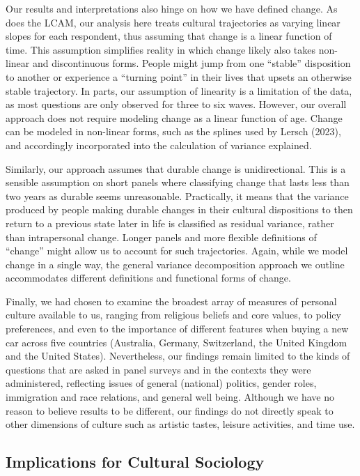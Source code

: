 \documentclass[
  12pt,
]{article}
\begin{document}
Our results and interpretations also hinge on how we have defined
change. As does the LCAM, our analysis here treats cultural trajectories
as varying linear slopes for each respondent, thus assuming that change
is a linear function of time. This assumption simplifies reality in
which change likely also takes non-linear and discontinuous forms.
People might jump from one ``stable'' disposition to another or
experience a ``turning point'' in their lives that upsets an otherwise
stable trajectory. In parts, our assumption of linearity is a limitation
of the data, as most questions are only observed for three to six waves.
However, our overall approach does not require modeling change as a
linear function of age. Change can be modeled in non-linear forms, such
as the splines used by Lersch (2023), and accordingly incorporated into
the calculation of variance explained.

Similarly, our approach assumes that durable change is unidirectional.
This is a sensible assumption on short panels where classifying change
that lasts less than two years as durable seems unreasonable.
Practically, it means that the variance produced by people making
durable changes in their cultural dispositions to then return to a
previous state later in life is classified as residual variance, rather
than intrapersonal change. Longer panels and more flexible definitions
of ``change'' might allow us to account for such trajectories. Again,
while we model change in a single way, the general variance
decomposition approach we outline accommodates different definitions and
functional forms of change.

Finally, we had chosen to examine the broadest array of measures of
personal culture available to us, ranging from religious beliefs and
core values, to policy preferences, and even to the importance of
different features when buying a new car across five countries
(Australia, Germany, Switzerland, the United Kingdom and the United
States). Nevertheless, our findings remain limited to the kinds of
questions that are asked in panel surveys and in the contexts they were
administered, reflecting issues of general (national) politics, gender
roles, immigration and race relations, and general well being. Although
we have no reason to believe results to be different, our findings do
not directly speak to other dimensions of culture such as artistic
tastes, leisure activities, and time use.

\hypertarget{implications-for-cultural-sociology}{%
\subsection{Implications for Cultural
Sociology}\label{implications-for-cultural-sociology}}
\end{document}
